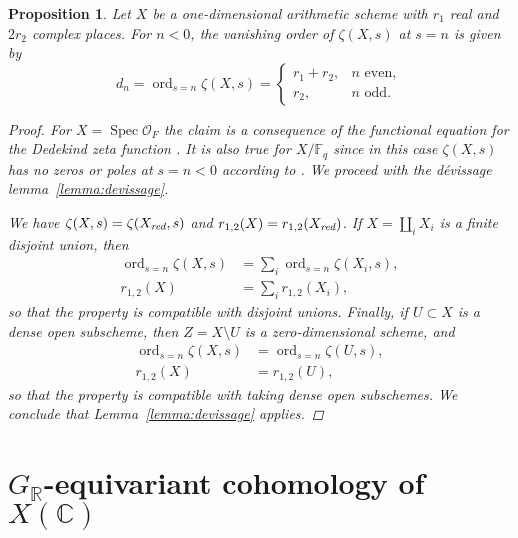 \documentclass[draft]{article}
\DeclareMathOperator{\ord}{ord}
\DeclareMathOperator{\Spec}{Spec}
\newcommand{\CC}{\mathbb{C}}
\newcommand{\FF}{\mathbb{F}}
\newcommand{\RR}{\mathbb{R}}
\newcommand{\red}{\text{\it red}}
\theoremstyle{myplain}
\newtheorem{proposition}[theorem]{Proposition}
\theoremstyle{mydefinition}
\numberwithin{equation}{section}
\begin{document}
\begin{proposition}
  \label{prop:vanishing-order-equals-dn}
  Let $X$ be a one-dimensional arithmetic scheme with $r_1$ real and $2r_2$
  complex places. For $n < 0$, the vanishing order of $\zeta (X,s)$ at $s = n$
  is given by
  \begin{equation}
    \label{eqn:dn}
    d_n = \ord_{s = n} \zeta (X,s) =
    \begin{cases}
      r_1 + r_2, & n\text{ even}, \\
      r_2, & n\text{ odd}.
    \end{cases}
  \end{equation}

  \begin{proof}
    For $X = \Spec \mathcal{O}_F$ the claim is a consequence of the functional
    equation for the Dedekind zeta function \cite[\S VII.5]{Neukirch-1999}.
    It is also true for $X/\FF_q$ since in this case $\zeta (X,s)$ has no zeros
    or poles at $s = n < 0$ according to \cite[pp.\,26--27]{Katz-1994}.
    We proceed with the d\'{e}vissage lemma~\ref{lemma:devissage}.

    We have $\zeta (X,s) = \zeta (X_\red,s)$ and
    $r_{1,2} (X) = r_{1,2} (X_\red)$.
    If $X = \coprod_i X_i$ is a finite disjoint union, then
    \begin{align*}
      \ord_{s = n} \zeta (X,s) & = \sum_i \ord_{s = n} \zeta (X_i,s), \\
      r_{1,2} (X) & = \sum_i r_{1,2} (X_i),
    \end{align*}
    so that the property is compatible with disjoint unions. Finally, if
    $U \subset X$ is a dense open subscheme, then $Z = X\setminus U$ is a
    zero-dimensional scheme, and
    \begin{align*}
      \ord_{s = n} \zeta (X,s) & = \ord_{s = n} \zeta (U,s), \\
      r_{1,2} (X) & = r_{1,2} (U),
    \end{align*}
    so that the property is compatible with taking dense open subschemes.
    We conclude that Lemma~\ref{lemma:devissage} applies.
  \end{proof}
\end{proposition}


\section{$G_\RR$-equivariant cohomology of $X(\CC)$}
\label{sec:GR-equivariant-cohomology}
\end{document}
